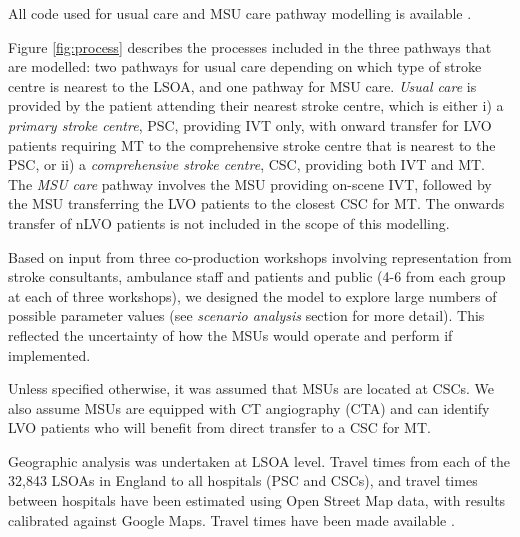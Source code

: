 All code used for usual care and MSU care pathway modelling is available \cite{github1}.

Figure \ref{fig:process} describes the processes included in the three pathways that are modelled: two pathways for usual care depending on which type of stroke centre is nearest to the LSOA, and one pathway for MSU care. \textit{Usual care} is provided by the patient attending their nearest stroke centre, which is either i) a \textit{primary stroke centre}, PSC, providing IVT only, with onward transfer for LVO patients  requiring MT to the comprehensive stroke centre that is nearest to the PSC, or ii) a \textit{comprehensive stroke centre}, CSC, providing both IVT and MT. The \textit{MSU care} pathway involves the MSU providing on-scene IVT, followed by the MSU transferring the LVO patients to the closest CSC for MT. The onwards transfer of nLVO patients is not included in the scope of this modelling.

Based on input from three co-production workshops \cite{moseley_co-design_2024} involving representation from stroke consultants, ambulance staff and patients and public (4-6 from each group at each of three workshops), we designed the model to explore large numbers of possible parameter values (see \emph{scenario analysis} section for more detail). This reflected the uncertainty of how the MSUs would operate and perform if implemented.

Unless specified otherwise, it was assumed that MSUs are located at CSCs. We also assume MSUs are equipped with CT angiography (CTA) and can identify LVO patients who will benefit from direct transfer to a CSC for MT.

Geographic analysis was undertaken at LSOA level. Travel times from each of the 32,843 LSOAs in England to all hospitals (PSC and CSCs), and travel times between hospitals have been estimated using Open Street Map data, with results calibrated against Google Maps. Travel times have been made available \cite{gitlab1}.

